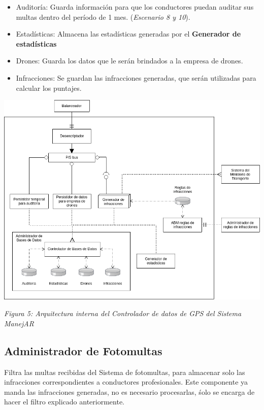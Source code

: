 \begin{itemize}
  \item Auditoría: Guarda información para que los conductores puedan auditar
  sus multas dentro del período de 1 mes. (\textit{Escenario 8 y 10}).
  \item Estadísticas: Almacena las estadísticas generadas por el \textbf{Generador de estadísticas}
  \item Drones: Guarda los datos que le serán brindados a la empresa de drones.
  \item Infracciones: Se guardan las infracciones generadas, que serán utilizadas
  para calcular los puntajes.
\end{itemize}



\centerline{\includegraphics[width=1\textwidth]{./imagenes/arquitectura_tp2/controlador_datos_gps.png}}
\centerline{\textit{Figura 5: Arquitectura interna del Controlador de datos de GPS del Sistema ManejAR}}



\subsection{Administrador de Fotomultas}
Filtra las multas recibidas del Sistema de fotomultas, para almacenar solo las 
infracciones correspondientes a conductores profesionales.
Este componente ya manda las infracciones generadas, no es necesario procesarlas,
śolo se encarga de hacer el filtro explicado anteriormente.

